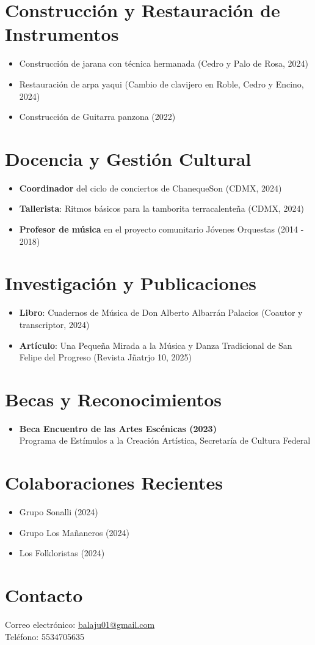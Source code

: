 \documentclass{article}
\begin{document}
\section*{Construcción y Restauración de Instrumentos}
\begin{itemize}
    \item Construcción de jarana con técnica hermanada (Cedro y Palo de Rosa, 2024)
    \item Restauración de arpa yaqui (Cambio de clavijero en Roble, Cedro y Encino, 2024)
    \item Construcción de Guitarra panzona (2022)
\end{itemize}

\section*{Docencia y Gestión Cultural}
\begin{itemize}
    \item \textbf{Coordinador} del ciclo de conciertos de ChanequeSon (CDMX, 2024)
    \item \textbf{Tallerista}: Ritmos básicos para la tamborita terracalenteña (CDMX, 2024)
    \item \textbf{Profesor de música} en el proyecto comunitario Jóvenes Orquestas (2014 - 2018)
\end{itemize}

\section*{Investigación y Publicaciones}
\begin{itemize}
    \item \textbf{Libro}: Cuadernos de Música de Don Alberto Albarrán Palacios (Coautor y transcriptor, 2024)
    \item \textbf{Artículo}: Una Pequeña Mirada a la Música y Danza Tradicional de San Felipe del Progreso (Revista Jñatrjo 10, 2025)
\end{itemize}

\section*{Becas y Reconocimientos}
\begin{itemize}
    \item \textbf{Beca Encuentro de las Artes Escénicas (2023)}\\ Programa de Estímulos a la Creación Artística, Secretaría de Cultura Federal
\end{itemize}

\section*{Colaboraciones Recientes}
\begin{itemize}
    \item Grupo Sonalli (2024)
    \item Grupo Los Mañaneros (2024)
    \item Los Folkloristas (2024)
\end{itemize}

\section*{Contacto}
Correo electrónico: \href{mailto:balaju01@gmail.com}{balaju01@gmail.com}\\
Teléfono: 5534705635
\end{document}
